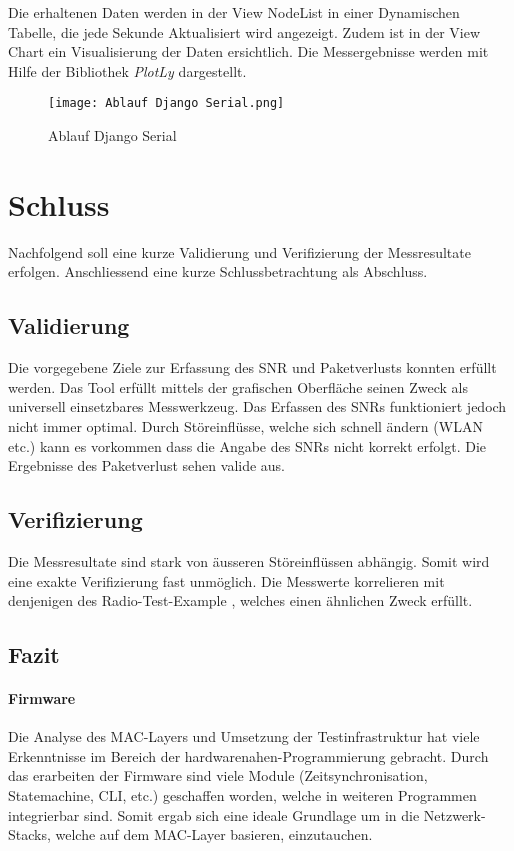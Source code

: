 Die erhaltenen Daten werden in der View Node\textunderscore List in einer Dynamischen Tabelle, die jede Sekunde Aktualisiert wird angezeigt. Zudem ist in der View Chart ein Visualisierung der Daten ersichtlich. Die Messergebnisse werden mit Hilfe der Bibliothek \textit{PlotLy} dargestellt. 

\begin{figure} [H]
	\centering
	\texttt{[image: Ablauf Django Serial.png]}
	\caption{Ablauf Django Serial}
	\label{fig:AblaufDjangoSerial}
\end{figure}

\newpage
\section{Schluss}\label{sec:SchlussP2P}

Nachfolgend soll eine kurze Validierung und Verifizierung der Messresultate erfolgen. Anschliessend eine kurze Schlussbetrachtung als Abschluss. 

\subsection{Validierung}\label{subsec:P2PValidierung}
Die vorgegebene Ziele zur Erfassung des SNR und Paketverlusts konnten erfüllt werden.
Das Tool erfüllt mittels der grafischen Oberfläche seinen Zweck als universell einsetzbares Messwerkzeug.
Das Erfassen des SNRs funktioniert jedoch nicht immer optimal.
Durch Störeinflüsse, welche sich schnell ändern (WLAN etc.) kann es vorkommen dass die Angabe des SNRs nicht korrekt erfolgt.
Die Ergebnisse des Paketverlust sehen valide aus. 

\subsection{Verifizierung}\label{subsec:P2PVerifizierung}
Die Messresultate sind stark von äusseren Störeinflüssen abhängig. Somit wird eine exakte Verifizierung fast unmöglich.
Die Messwerte korrelieren mit denjenigen des Radio-Test-Example \cite{nrf_connect_sdk_radio_test_example_2020}, welches einen ähnlichen Zweck erfüllt. 

\subsection{Fazit}\label{subsec:FazitP2P}
\paragraph{Firmware}
Die Analyse des MAC-Layers und Umsetzung der Testinfrastruktur hat viele Erkenntnisse im Bereich der hardwarenahen-Programmierung gebracht. Durch das erarbeiten der Firmware sind viele Module (Zeitsynchronisation, Statemachine, CLI, etc.) geschaffen worden, welche in weiteren Programmen integrierbar sind. Somit ergab sich eine ideale Grundlage um in die Netzwerk-Stacks, welche auf dem MAC-Layer basieren, einzutauchen. 


